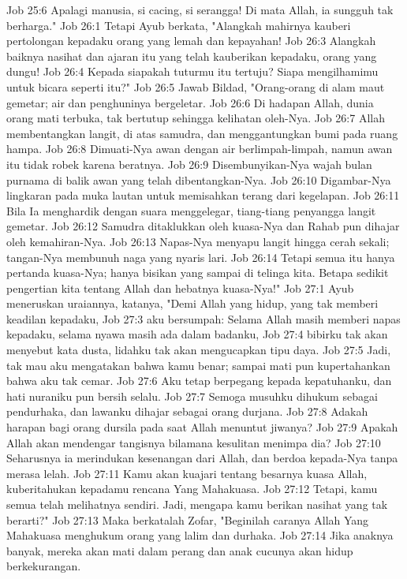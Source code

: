 Job 25:6  Apalagi manusia, si cacing, si serangga! Di mata Allah, ia sungguh tak berharga."
Job 26:1  Tetapi Ayub berkata, "Alangkah mahirnya kauberi pertolongan kepadaku orang yang lemah dan kepayahan!
Job 26:3  Alangkah baiknya nasihat dan ajaran itu yang telah kauberikan kepadaku, orang yang dungu!
Job 26:4  Kepada siapakah tuturmu itu tertuju? Siapa mengilhamimu untuk bicara seperti itu?"
Job 26:5  Jawab Bildad, "Orang-orang di alam maut gemetar; air dan penghuninya bergeletar.
Job 26:6  Di hadapan Allah, dunia orang mati terbuka, tak bertutup sehingga kelihatan oleh-Nya.
Job 26:7  Allah membentangkan langit, di atas samudra, dan menggantungkan bumi pada ruang hampa.
Job 26:8  Dimuati-Nya awan dengan air berlimpah-limpah, namun awan itu tidak robek karena beratnya.
Job 26:9  Disembunyikan-Nya wajah bulan purnama di balik awan yang telah dibentangkan-Nya.
Job 26:10  Digambar-Nya lingkaran pada muka lautan untuk memisahkan terang dari kegelapan.
Job 26:11  Bila Ia menghardik dengan suara menggelegar, tiang-tiang penyangga langit gemetar.
Job 26:12  Samudra ditaklukkan oleh kuasa-Nya dan Rahab pun dihajar oleh kemahiran-Nya.
Job 26:13  Napas-Nya menyapu langit hingga cerah sekali; tangan-Nya membunuh naga yang nyaris lari.
Job 26:14  Tetapi semua itu hanya pertanda kuasa-Nya; hanya bisikan yang sampai di telinga kita. Betapa sedikit pengertian kita tentang Allah dan hebatnya kuasa-Nya!"
Job 27:1  Ayub meneruskan uraiannya, katanya, "Demi Allah yang hidup, yang tak memberi keadilan kepadaku,
Job 27:3  aku bersumpah: Selama Allah masih memberi napas kepadaku, selama nyawa masih ada dalam badanku,
Job 27:4  bibirku tak akan menyebut kata dusta, lidahku tak akan mengucapkan tipu daya.
Job 27:5  Jadi, tak mau aku mengatakan bahwa kamu benar; sampai mati pun kupertahankan bahwa aku tak cemar.
Job 27:6  Aku tetap berpegang kepada kepatuhanku, dan hati nuraniku pun bersih selalu.
Job 27:7  Semoga musuhku dihukum sebagai pendurhaka, dan lawanku dihajar sebagai orang durjana.
Job 27:8  Adakah harapan bagi orang dursila pada saat Allah menuntut jiwanya?
Job 27:9  Apakah Allah akan mendengar tangisnya bilamana kesulitan menimpa dia?
Job 27:10  Seharusnya ia merindukan kesenangan dari Allah, dan berdoa kepada-Nya tanpa merasa lelah.
Job 27:11  Kamu akan kuajari tentang besarnya kuasa Allah, kuberitahukan kepadamu rencana Yang Mahakuasa.
Job 27:12  Tetapi, kamu semua telah melihatnya sendiri. Jadi, mengapa kamu berikan nasihat yang tak berarti?"
Job 27:13  Maka berkatalah Zofar, "Beginilah caranya Allah Yang Mahakuasa menghukum orang yang lalim dan durhaka.
Job 27:14  Jika anaknya banyak, mereka akan mati dalam perang dan anak cucunya akan hidup berkekurangan.
